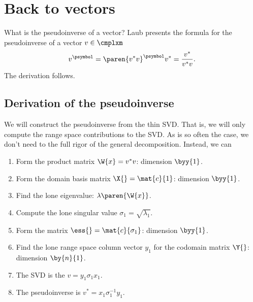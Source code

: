\section{Back to vectors}
What is the pseudoinverse of a vector? Laub \cite[p. ??]{Laub2005} presents the formula for the pseudoinverse of a vector $v\in\cmplxm$
\begin{equation}
  v^{\psymbol} = \paren{v^{*}v}^{\psymbol}v^{*} = \frac{ v^{*} }{ v^{*}v }.
\end{equation}
The derivation follows.

\subsection{Derivation of the pseudoinverse}
We will construct the pseudoinverse from the thin SVD. That is, we will only compute the range space contributions to the SVD. As is so often the case, we don't need to the full rigor of the general decomposition. Instead, we can
\begin{enumerate}
\item Form the product matrix $\W{x} = v^{*}v$: dimension $\byy{1}$.
\item Form the domain basis matrix $\X{} = \mat{c}{1}$: dimension $\byy{1}$.
\item Find the lone eigenvalue: $\lambda\paren{\W{x}}$.
\item Compute the lone singular value $\sigma_{1} = \sqrt{\lambda_{1}}$.
\item Form the matrix $\ess{} = \mat{c}{\sigma_{1}}$: dimension $\byy{1}$.
\item Find the lone range space column vector $y_{1}$ for the codomain matrix $\Y{}$: dimension $\by{n}{1}$.
\item The SVD is the $v = y_{1}\sigma_{1}x_{1}$.
\item The pseudoinverse is $v^{*} = x_{1}\sigma_{1}^{-1}y_{1}$.
\end{enumerate}


